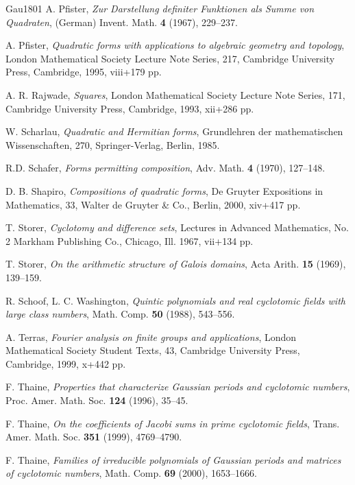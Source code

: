 \documentclass[a4paper, 11pt]{amsart}
\theoremstyle{plain}
\theoremstyle{definition}
\numberwithin{equation}{section}
\begin{document}
\begin{thebibliography}{Gau1801}
A. Pfister, 
{\it Zur Darstellung definiter Funktionen als Summe von Quadraten}, (German) 
Invent. Math. \textbf{4} (1967), 229--237.

A. Pfister, 
{\it Quadratic forms with applications to algebraic geometry and topology}, 
London Mathematical Society Lecture Note Series, 217, 
Cambridge University Press, Cambridge, 1995, viii+179 pp.

A. R. Rajwade, 
{\it Squares}, 
London Mathematical Society Lecture Note Series, 171, 
Cambridge University Press, Cambridge, 1993, xii+286 pp. 

W. Scharlau, 
{\it Quadratic and Hermitian forms}, 
Grundlehren der mathematischen Wissenschaften, 270, 
Springer-Verlag, Berlin, 1985. 

R.D. Schafer, 
{\it Forms permitting composition},
Adv. Math. \textbf{4} (1970), 127--148.

D. B. Shapiro, 
{\it Compositions of quadratic forms}, 
De Gruyter Expositions in Mathematics, 33, 
Walter de Gruyter \& Co., Berlin, 2000, xiv+417 pp.

T. Storer, 
{\it Cyclotomy and difference sets}, 
Lectures in Advanced Mathematics, 
No. 2 Markham Publishing Co., Chicago, Ill. 1967, vii+134 pp.

T. Storer, 
{\it On the arithmetic structure of Galois domains}, 
Acta Arith. \textbf{15} (1969), 139--159.

R. Schoof, L. C. Washington, 
{\it Quintic polynomials and real cyclotomic fields with large class numbers}, 
Math. Comp. \textbf{50} (1988), 543--556. 

A. Terras, 
{\it Fourier analysis on finite groups and applications}, 
London Mathematical Society Student Texts, 43, 
Cambridge University Press, Cambridge, 1999, x+442 pp. 

F. Thaine, 
\textit{Properties that characterize Gaussian periods and cyclotomic numbers}, 
Proc. Amer. Math. Soc. \textbf{124} (1996), 35--45.  

F. Thaine, 
\textit{On the coefficients of Jacobi sums in prime cyclotomic fields},
Trans. Amer. Math. Soc. \textbf{351} (1999), 4769--4790.

F. Thaine, 
\textit{Families of irreducible polynomials of Gaussian periods and matrices of cyclotomic numbers},
Math. Comp. \textbf{69} (2000), 1653--1666.


\end{thebibliography}
\end{document}
